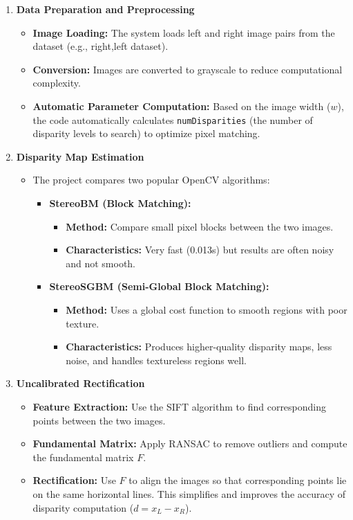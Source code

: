 \documentclass[a4paper,12pt]{article}
\begin{document}
\begin{enumerate}
    \item \textbf{Data Preparation and Preprocessing}
    \begin{itemize}
        \item \textbf{Image Loading:} The system loads left and right image pairs from the dataset (e.g., right,left dataset).
        \item \textbf{Conversion:} Images are converted to grayscale to reduce computational complexity.
        \item \textbf{Automatic Parameter Computation:} Based on the image width ($w$), the code automatically calculates \texttt{numDisparities} (the number of disparity levels to search) to optimize pixel matching.
    \end{itemize}

    \item \textbf{Disparity Map Estimation}
    \begin{itemize}
        \item The project compares two popular OpenCV algorithms:
        \begin{itemize}
            \item \textbf{StereoBM (Block Matching):} 
            \begin{itemize}
                \item \textbf{Method:} Compare small pixel blocks between the two images.
                \item \textbf{Characteristics:} Very fast (0.013s) but results are often noisy and not smooth.
            \end{itemize}
            \item \textbf{StereoSGBM (Semi-Global Block Matching):} 
            \begin{itemize}
                \item \textbf{Method:} Uses a global cost function to smooth regions with poor texture.
                \item \textbf{Characteristics:} Produces higher-quality disparity maps, less noise, and handles textureless regions well.
            \end{itemize}
        \end{itemize}
    \end{itemize}

    \item \textbf{Uncalibrated Rectification}
    \begin{itemize}
        \item \textbf{Feature Extraction:} Use the SIFT algorithm to find corresponding points between the two images.
        \item \textbf{Fundamental Matrix:} Apply RANSAC to remove outliers and compute the fundamental matrix $F$.
        \item \textbf{Rectification:} Use $F$ to align the images so that corresponding points lie on the same horizontal lines. This simplifies and improves the accuracy of disparity computation ($d = x_L - x_R$).
    \end{itemize}


\end{enumerate}
\end{document}
